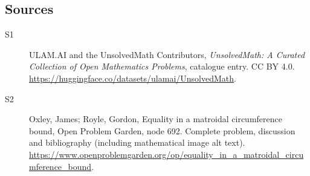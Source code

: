 \documentclass[11pt]{book}
\begin{document}
\subsection{Sources}
\begin{description}
\item[\hypertarget{source:statement:1}{S1}] ULAM.AI and the UnsolvedMath Contributors, \emph{UnsolvedMath: A Curated Collection of Open Mathematics Problems}, catalogue entry. CC BY 4.0. \url{https://huggingface.co/datasets/ulamai/UnsolvedMath}.
\item[\hypertarget{source:statement:2}{S2}] Oxley, James; Royle, Gordon, Equality in a matroidal circumference bound, Open Problem Garden, node 692. Complete problem, discussion and bibliography (including mathematical image alt text). \url{https://www.openproblemgarden.org/op/equality_in_a_matroidal_circumference_bound}.
\end{description}
\label{end:statement}
\end{document}
